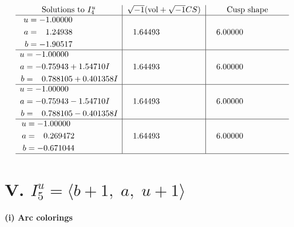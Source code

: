 \documentclass[1p]{elsarticle_modified}
\theoremstyle{definition}
\newcommand{\I}{\sqrt{-1}}
\begin{document}
$$\begin{array}{c|c|c}  
\text{Solutions to }I^u_{4}& \I (\text{vol} + \sqrt{-1}CS) & \text{Cusp shape}\\
 \hline 
\begin{aligned}
u &= -1.00000\phantom{ +0.000000I} \\
a &= \phantom{-}1.24938\phantom{ +0.000000I} \\
b &= -1.90517\phantom{ +0.000000I}\end{aligned}
 & \phantom{-}1.64493\phantom{ +0.000000I} & \phantom{-}6.00000\phantom{ +0.000000I} \\ \hline\begin{aligned}
u &= -1.00000\phantom{ +0.000000I} \\
a &= -0.75943 + 1.54710 I \\
b &= \phantom{-}0.788105 + 0.401358 I\end{aligned}
 & \phantom{-}1.64493\phantom{ +0.000000I} & \phantom{-}6.00000\phantom{ +0.000000I} \\ \hline\begin{aligned}
u &= -1.00000\phantom{ +0.000000I} \\
a &= -0.75943 - 1.54710 I \\
b &= \phantom{-}0.788105 - 0.401358 I\end{aligned}
 & \phantom{-}1.64493\phantom{ +0.000000I} & \phantom{-}6.00000\phantom{ +0.000000I} \\ \hline\begin{aligned}
u &= -1.00000\phantom{ +0.000000I} \\
a &= \phantom{-}0.269472\phantom{ +0.000000I} \\
b &= -0.671044\phantom{ +0.000000I}\end{aligned}
 & \phantom{-}1.64493\phantom{ +0.000000I} & \phantom{-}6.00000\phantom{ +0.000000I}\\
 \hline 
 \end{array}$$\newpage\newpage\renewcommand{\arraystretch}{1}
\centering \section*{V. $I^u_{5}= \langle b+1,\;a,\;u+1 \rangle$}
\flushleft \textbf{(i) Arc colorings}\\
\end{document}
